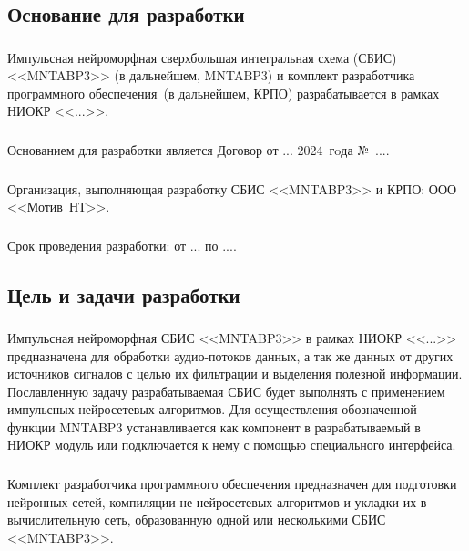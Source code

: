 \subsection{Основание для разработки}

\subsubsection{}
Импульсная нейроморфная сверхбольшая интегральная схема (СБИС) <<MNTABP3>>
(в дальнейшем, MNTABP3) и
комплект разработчика программного обеспечения~(в дальнейшем, КРПО)
разрабатывается в рамках
НИОКР <<...>>.

\subsubsection{}
Основанием для разработки является Договор от ... 2024~гoда №~....

\subsubsection{}
Организация, выполняющая разработку СБИС <<MNTABP3>> и КРПО: ООО <<Мотив~НТ>>.

\subsubsection{}
Срок проведения разработки: от ... по ....

\subsection{Цель и задачи разработки}

\subsubsection{}
Импульсная нейроморфная СБИС <<MNTABP3>> в рамках НИОКР <<...>> предназначена
для обработки аудио-потоков данных, а так же данных от других источников
сигналов с целью их фильтрации и выделения полезной информации. Пославленную
задачу разрабатываемая СБИС будет выполнять с применением импульсных
нейросетевых алгоритмов. Для осуществления обозначенной функции MNTABP3
устанавливается как компонент в разрабатываемый в НИОКР модуль или подключается
к нему с помощью специального интерфейса.

\subsubsection{}
Комплект разработчика программного обеспечения предназначен для подготовки
нейронных сетей, компиляции не нейросетевых алгоритмов и укладки их в вычислительную
сеть, образованную одной или несколькими СБИС <<MNTABP3>>.

